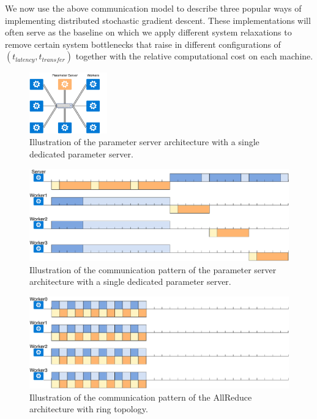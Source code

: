 We now use the above communication model to describe
three popular ways of implementing distributed stochastic 
gradient descent. These implementations will often serve
as the baseline on which we apply different system relaxations
to remove certain system bottlenecks that raise in 
different configurations of $(t_{latency}, t_{transfer})$
together with the relative computational cost on each machine.

\begin{figure}[t!]
\centering
\includegraphics[width=0.3\textwidth]{figures/Chpt1.3/Communication_PS1.pdf}
\caption{Illustration of the parameter server architecture 
with a single dedicated parameter server.}
\label{fig:communication_illustration_ps1}
\end{figure}


\begin{figure}[t!]
\centering
\includegraphics[width=1.0\textwidth]{figures/Chpt1.3/Communication_PS.pdf}
\caption{Illustration of the communication
pattern of the parameter server architecture 
with a single dedicated parameter server.}
\label{fig:communication_illustration_timeline_ps1}
\end{figure}


\begin{figure}[t!]
\centering
\includegraphics[width=1.0\textwidth]{figures/Chpt1.3/Communication_pattern_AllReduce.pdf}
\caption{Illustration of the communication
pattern of the AllReduce architecture with ring topology.}
\label{fig:communication_illustration_timeline_allreduce}
\end{figure}


